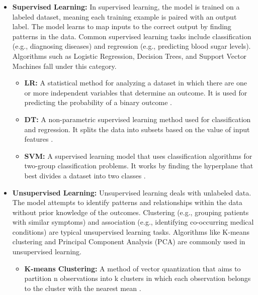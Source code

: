 \begin{itemize}
    \item \textbf{Supervised Learning:} In supervised learning, the model is trained on a labeled dataset, meaning each training example is paired with an output label. The model learns to map inputs to the correct output by finding patterns in the data. Common supervised learning tasks include classification (e.g., diagnosing diseases) and regression (e.g., predicting blood sugar levels). Algorithms such as Logistic Regression, Decision Trees, and Support Vector Machines fall under this category.
        \begin{itemize}
            \item \textbf{LR:} A statistical method for analyzing a dataset in which there are one or more independent variables that determine an outcome. It is used for predicting the probability of a binary outcome \cite{Ref6}.
            \item \textbf{DT:} A non-parametric supervised learning method used for classification and regression. It splits the data into subsets based on the value of input features \cite{Ref7}.
            \item \textbf{SVM:} A supervised learning model that uses classification algorithms for two-group classification problems. It works by finding the hyperplane that best divides a dataset into two classes \cite{Ref8}.
        \end{itemize}
    
    \item \textbf{Unsupervised Learning:} Unsupervised learning deals with unlabeled data. The model attempts to identify patterns and relationships within the data without prior knowledge of the outcomes. Clustering (e.g., grouping patients with similar symptoms) and association (e.g., identifying co-occurring medical conditions) are typical unsupervised learning tasks. Algorithms like K-means clustering and Principal Component Analysis (PCA) are commonly used in unsupervised learning.
        \begin{itemize}
            \item \textbf{K-means Clustering:} A method of vector quantization that aims to partition n observations into k clusters in which each observation belongs to the cluster with the nearest mean \cite{Ref9}.
        \end{itemize}
    

\end{itemize}
